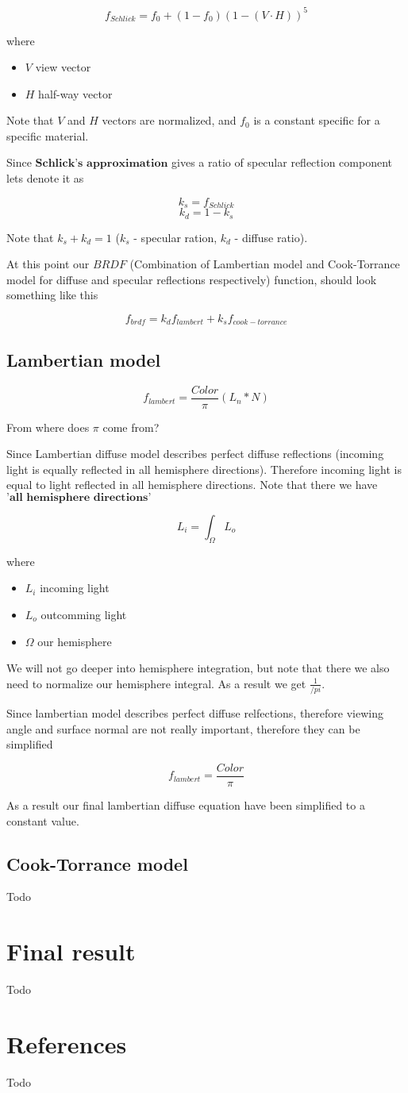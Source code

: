 \documentclass{article}
\begin{document}
\[
    f_{Schlick} = f_{0} + (1 - f_{0})(1 - (V \cdot H))^5
\]

where
\begin{itemize}
    \item $V$ view vector
    \item $H$ half-way vector
\end{itemize}

Note that $V$ and $H$ vectors are normalized, and $f_{0}$ is a constant specific for a specific material.

Since $\textbf{Schlick's approximation}$ gives a ratio of specular reflection component lets denote it as

\[
    k_s = f_{Schlick}
\]
\[
    k_d = 1 - k_s
\]

Note that $k_s + k_d = 1$ ($k_s$ - specular ration, $k_d$ - diffuse ratio).

At this point our $BRDF$ (Combination of Lambertian model and Cook-Torrance model for diffuse and specular reflections respectively) function, 
should look something like this

\[
    f_{brdf} = k_d f_{lambert} + k_s f_{cook-torrance}
\]

\subsection{Lambertian model}

\[
    f_{lambert} = \frac{Color}{\pi}(L_{n} * N)
\]

From where does $\pi$ come from?

Since Lambertian diffuse model describes perfect diffuse reflections
(incoming light is equally reflected in all hemisphere directions).
Therefore incoming light is equal to light reflected in all hemisphere directions.
Note that there we have $\textbf{'all hemisphere directions'}$

\[
    L_i = \int _{\Omega } L_o
\]

where
\begin{itemize}
    \item $L_i$ incoming light
    \item $L_o$ outcomming light
    \item $\Omega$ our hemisphere
\end{itemize}

We will not go deeper into hemisphere integration, but note that
there we also need to normalize our hemisphere integral. As a result we get $\frac{1}{/pi}$.

Since lambertian model describes perfect diffuse relfections,
therefore viewing angle and surface normal are not
really important, therefore they can be simplified 

\[
    f_{lambert} = \frac{Color}{\pi}
\]

As a result our final lambertian diffuse equation have been simplified to a constant value.

\subsection{Cook-Torrance model}
Todo

\section{Final result}
Todo

\section{References}
Todo
\end{document}
